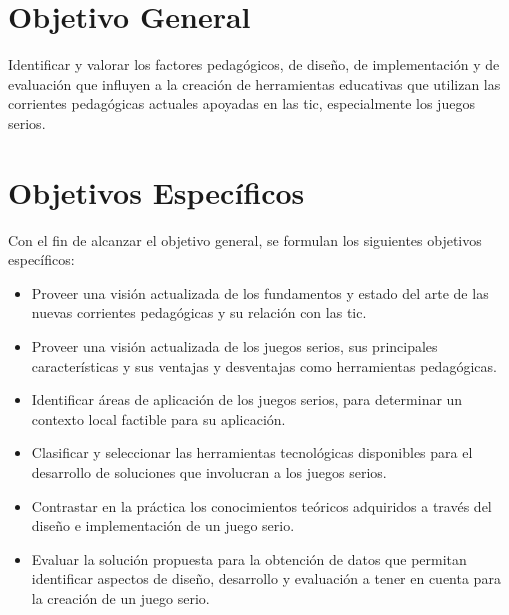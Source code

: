 \section{Objetivo General}
\label{sec:objetivos_generales}

Identificar y valorar los factores pedagógicos, de diseño, de implementación y
de evaluación que influyen a la creación de herramientas educativas que utilizan
las corrientes pedagógicas actuales apoyadas en las \gls{tic}, especialmente
los juegos serios.

\section{Objetivos Específicos}

Con el fin de alcanzar el objetivo general, se formulan los siguientes objetivos específicos:

\begin{itemize}

\item Proveer una visión actualizada de los fundamentos y estado del arte de las
    nuevas corrientes pedagógicas y su relación con las \gls{tic}.

\item Proveer una visión actualizada de los juegos serios, sus principales
    características y sus ventajas y desventajas como herramientas pedagógicas.

\item Identificar áreas de aplicación de los juegos serios, para determinar un
    contexto local factible para su aplicación.

\item Clasificar y seleccionar las herramientas tecnológicas disponibles para el
    desarrollo de soluciones que involucran a los juegos serios.

\item Contrastar en la práctica los conocimientos teóricos adquiridos a través
    del diseño e implementación de un juego serio.

\item Evaluar la solución propuesta para la obtención de datos que permitan
    identificar aspectos de diseño, desarrollo y evaluación a tener en cuenta
    para la creación de un juego serio.

\end{itemize}
